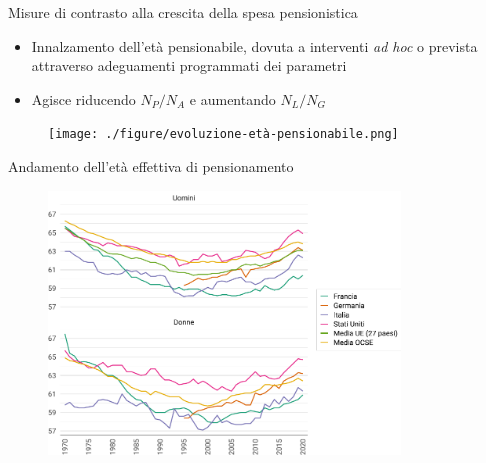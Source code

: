 \documentclass[aspectratio=64,11pt]{beamer}
\begin{document}
\begin{frame}{Misure di contrasto alla crescita della spesa pensionistica}
\begin{itemize}
\item Innalzamento dell'età pensionabile, dovuta a interventi \emph{ad hoc} o prevista
attraverso adeguamenti programmati dei parametri
\item Agisce riducendo $N_P/N_A$ e aumentando $N_L/N_G$
\end{itemize}

\begin{figure}[htbp]
\centering
\texttt{[image: ./figure/evoluzione-età-pensionabile.png]}
\end{figure}
\end{frame}


\begin{frame}{Andamento dell'età effettiva di pensionamento}
\begin{figure}[htbp]
\centering
\includegraphics[height=7cm]{./figure/eta-effettiva-pensionamento-color.pdf}
\end{figure}
\end{frame}
\end{document}
